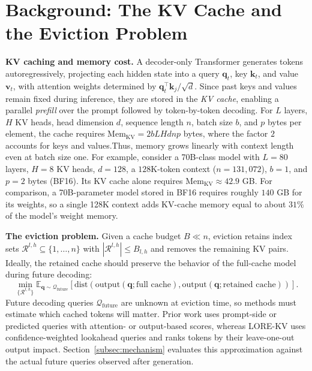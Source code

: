 \documentclass{article} %
\begin{document}



\appendix

\section{Background: The KV Cache and the Eviction Problem} \label{app:kv_background}

\textbf{KV caching and memory cost.}
A decoder-only Transformer \citep{vaswani2017attention} generates tokens autoregressively, projecting each hidden state into a query $\mathbf{q}_t$, key $\mathbf{k}_t$, and value $\mathbf{v}_t$, with attention weights determined by $\mathbf{q}_t^\top\mathbf{k}_j/\sqrt{d}$. Since past keys and values remain fixed during inference, they are stored in the \emph{KV cache}, enabling a parallel \emph{prefill} over the prompt followed by token-by-token decoding. For $L$ layers, $H$ KV heads, head dimension $d$, sequence length $n$, batch size $b$, and $p$ bytes per element, the cache requires $\mathrm{Mem}_{\mathrm{KV}} = 2bLHdnp$ bytes, where the factor $2$ accounts for keys and values.Thus, memory grows linearly with context length even at batch size one. For example, consider a 70B-class model with $L=80$ layers, $H=8$ KV heads, $d=128$, a $128$K-token context ($n=131{,}072$), $b=1$, and $p=2$ bytes (BF16). Its KV cache alone requires $\mathrm{Mem}_{\mathrm{KV}}\approx42.9$ GB. For comparison, a 70B-parameter model stored in BF16 requires roughly $140$ GB for its weights, so a single 128K context adds KV-cache memory equal to about $31\%$ of the model's weight memory.

\textbf{The eviction problem.}
\label{app:kv_eviction_problem}
Given a cache budget $B\ll n$, eviction retains index sets
$\mathcal{R}^{l,h}\subseteq\{1,\ldots,n\}$ with
$|\mathcal{R}^{l,h}|\le B_{l,h}$ and removes the remaining KV pairs. Ideally, the retained cache should preserve the behavior of the full-cache model during future decoding:
\begin{equation}
\min_{\{\mathcal{R}^{l,h}\}}
\mathbb{E}_{\mathbf{q}\sim\mathcal{Q}_{\mathrm{future}}}
\left[
\mathrm{dist}\!\left(
\mathrm{output}(\mathbf{q};\text{full cache}),
\mathrm{output}(\mathbf{q};\text{retained cache})
\right)
\right].
\label{eq:eviction_objective}
\end{equation}
Future decoding queries $\mathcal{Q}_{\mathrm{future}}$ are unknown at eviction time, so methods must estimate which cached tokens will matter. Prior work uses prompt-side or predicted queries with attention- or output-based scores, whereas LORE-KV uses confidence-weighted lookahead queries and ranks tokens by their leave-one-out output impact. Section~\ref{subsec:mechanism} evaluates this approximation against the actual future queries observed after generation.
\end{document}
